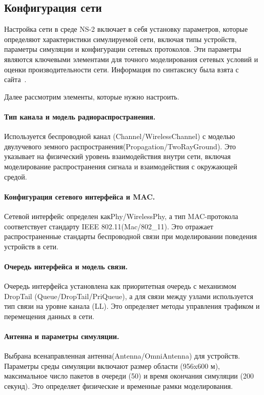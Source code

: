 \subsection{Конфигурация сети}

Настройка сети в среде NS-2 включает в себя установку параметров, которые определяют характеристики симулируемой сети, включая типы устройств, параметры симуляции и конфигурации сетевых протоколов. Эти параметры являются ключевыми элементами для точного моделирования сетевых условий и оценки производительности сети. Информация по синтаксису была взята с сайта~\cite{ns2_docs}.

Далее рассмотрим элементы, которые нужно настроить.

\paragraph{Тип канала и модель радиораспространения.}
Используется беспроводной канал \linebreak(Channel/WirelessChannel) с моделью двулучевого земного распространения\linebreak(Propagation/TwoRayGround). Это указывает на физический уровень взаимодействия внутри сети, включая моделирование распространения сигнала и взаимодействия с окружающей средой.

\paragraph{Конфигурация сетевого интерфейса и MAC.}
Сетевой интерфейс определен как\linebreak Phy/WirelessPhy, а тип MAC-протокола соответствует стандарту IEEE 802.11\linebreak(Mac/802\_11). Это отражает распространенные стандарты беспроводной связи при моделировании поведения устройств в сети.

\paragraph{Очередь интерфейса и модель связи.}
Очередь интерфейса установлена как приоритетная очередь с механизмом DropTail (Queue/DropTail/PriQueue), а для связи между узлами используется тип связи на уровне канала (LL). 
Это определяет методы управления трафиком и перемещения данных в сети.

\paragraph{Антенна и параметры симуляции.}
Выбрана всенаправленная антенна\linebreak(Antenna/OmniAntenna) для устройств. Параметры среды симуляции включают размер области (956x600 м), максимальное число пакетов в очереди (50) и время окончания симуляции (200 секунд). Это определяет физические и временные рамки моделирования.

